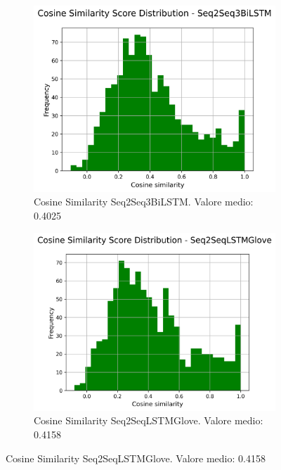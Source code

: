 \begin{figure}[H]
\begin{subfigure}{0.22\textwidth}
    \end{subfigure}
    \hfill
    \begin{subfigure}{0.22\textwidth}
        \centering
        \includegraphics[width=\textwidth]{media/Seq2Seq3BiLSTM_cosine_similarity_scores.png}
        \caption{Cosine Similarity Seq2Seq3BiLSTM. Valore medio: 0.4025}
    \end{subfigure}
    \hfill
    \begin{subfigure}{0.22\textwidth}
        \centering
        \includegraphics[width=\textwidth]{media/Seq2SeqLSTMGlove_cosine_similarity_scores.png}
        \caption{Cosine Similarity Seq2SeqLSTMGlove. Valore medio: 0.4158}
    \end{subfigure}

\end{figure}
